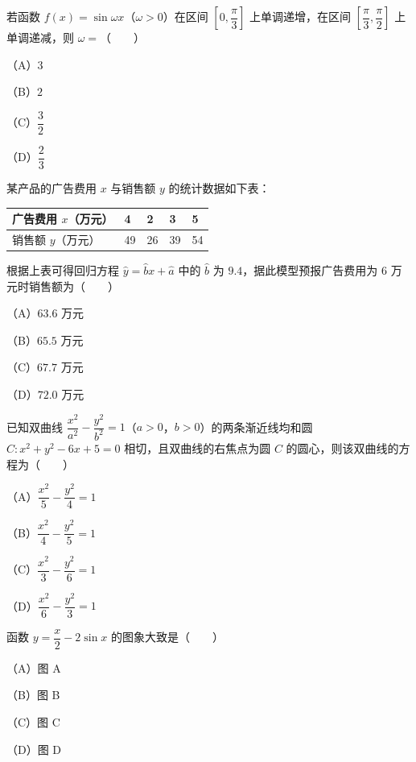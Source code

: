 \begin{question}
若函数 $f(x)=\sin\omega x$（$\omega>0$）在区间 $\left[0,\dfrac{\pi}{3}\right]$ 上单调递增，在区间 $\left[\dfrac{\pi}{3},\dfrac{\pi}{2}\right]$ 上单调递减，则 $\omega=$\mbox{（　　）}

（A）$3$

（B）$2$

（C）$\dfrac32$

（D）$\dfrac23$

\end{question}
\begin{question}
某产品的广告费用 $x$ 与销售额 $y$ 的统计数据如下表：

\begin{center}
\begin{tabular}{lllll}
\toprule
广告费用 $x$（万元） & 4 & 2 & 3 & 5 \\
\midrule
销售额 $y$（万元） & 49 & 26 & 39 & 54 \\
\bottomrule
\end{tabular}
\end{center}

根据上表可得回归方程 $\hat y=\hat bx+\hat a$ 中的 $\hat b$ 为 $9.4$，据此模型预报广告费用为 $6$ 万元时销售额为\mbox{（　　）}

（A）$63.6$ 万元

（B）$65.5$ 万元

（C）$67.7$ 万元

（D）$72.0$ 万元

\end{question}
\begin{question}
已知双曲线 $\dfrac{x^2}{a^2}-\dfrac{y^2}{b^2}=1$（$a>0$，$b>0$）的两条渐近线均和圆 $C:x^2+y^2-6x+5=0$ 相切，且双曲线的右焦点为圆 $C$ 的圆心，则该双曲线的方程为\mbox{（　　）}

（A）$\dfrac{x^2}{5}-\dfrac{y^2}{4}=1$

（B）$\dfrac{x^2}{4}-\dfrac{y^2}{5}=1$

（C）$\dfrac{x^2}{3}-\dfrac{y^2}{6}=1$

（D）$\dfrac{x^2}{6}-\dfrac{y^2}{3}=1$

\Needspace{0.4\textheight}
\end{question}
\begin{question}
函数 $y=\dfrac x2-2\sin x$ 的图象大致是\mbox{（　　）}

（A）图 A

（B）图 B

（C）图 C

（D）图 D
\nopagebreak[4]
\begin{center}\end{center}
\nopagebreak[4]
\end{question}
